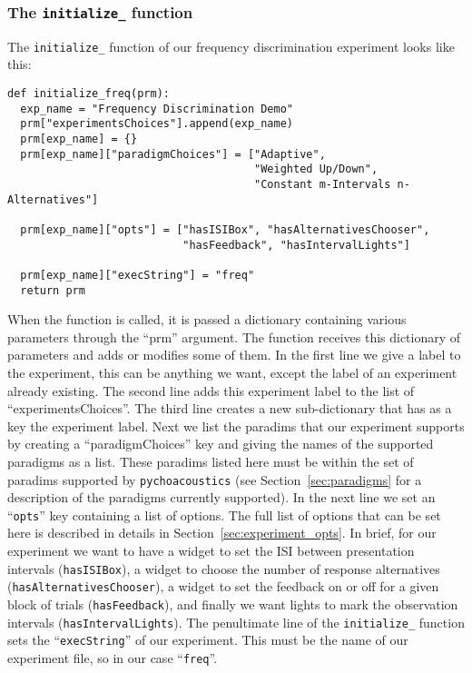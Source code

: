\subsubsection{The \texttt{initialize\_} function}
The \verb+initialize_+ function of our frequency discrimination experiment looks like this:
\begin{lstlisting}
def initialize_freq(prm):
  exp_name = "Frequency Discrimination Demo"
  prm["experimentsChoices"].append(exp_name)
  prm[exp_name] = {}
  prm[exp_name]["paradigmChoices"] = ["Adaptive",
                                      "Weighted Up/Down",
                                      "Constant m-Intervals n-Alternatives"]

  prm[exp_name]["opts"] = ["hasISIBox", "hasAlternativesChooser", 
                           "hasFeedback", "hasIntervalLights"]
    
  prm[exp_name]["execString"] = "freq"
  return prm
\end{lstlisting}
When the function is called, it is passed a dictionary containing various parameters through the ``prm'' argument.
The function receives this dictionary of parameters and adds or modifies some of them.
In the first line we give a label to the experiment, this can be anything we want, except the label of an experiment already existing.
The second line adds this experiment label to the list of ``experimentsChoices''.
The third line creates a new sub-dictionary that has as a key the experiment label.
Next we list the paradims that our experiment supports by creating a ``paradigmChoices'' key and giving
the names of the supported paradigms as a list. These paradims listed here must be within the set of paradims 
supported by \texttt{pychoacoustics} (see Section~\ref{sec:paradigms} for a description of the paradigms currently supported).
In the next line we set an ``\texttt{opts}'' key containing a list of options. The full list of options that can be set here
is described in details in Section~\ref{sec:experiment_opts}. In brief, for our experiment we want to have a widget to set the ISI between presentation
intervals (\texttt{hasISIBox}), a widget to choose the number of response alternatives (\texttt{hasAlternativesChooser}),
a widget to set the feedback on or off for a given block of trials (\texttt{hasFeedback}), and finally we want lights
to mark the observation intervals (\texttt{hasIntervalLights}).
The penultimate line of the \verb+initialize_+ function sets the ``\texttt{execString}'' of our experiment. This
must be the name of our experiment file, so in our case ``\texttt{freq}''.



